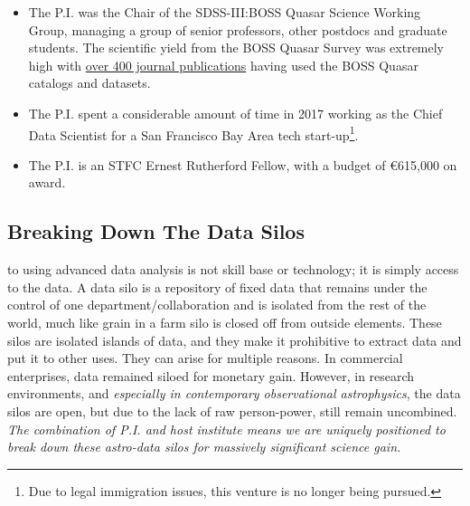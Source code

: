 \documentclass[oneside, a4paper, onecolumn, 11pt]{article}
\begin{document}
\begin{itemize}
\item The P.I. was the Chair
of the SDSS-III:BOSS Quasar Science Working Group, managing a
group of senior professors, other postdocs and graduate students.
The scientific yield from the BOSS Quasar Survey was extremely high 
with \href{https://tinyurl.com/ycxd8lb6}{over 400 journal publications} having 
used the BOSS Quasar catalogs and datasets.

\item The P.I. spent a considerable amount of time in 2017 working as the
Chief Data Scientist for a San Francisco Bay Area 
tech start-up\footnote{Due to legal immigration issues, this venture is no longer being pursued.}. 

\item The P.I. is an STFC Ernest Rutherford Fellow, with a budget of \euro615,000 on award. 
\end{itemize}

\subsection*{Breaking Down The Data Silos}
to using advanced data analysis is not skill base or technology; it is
simply access to the data.  A data silo is a repository of fixed data
that remains under the control of one department/collaboration and is
isolated from the rest of the world, much like grain in a farm silo is
closed off from outside elements. These silos are isolated islands of
data, and they make it prohibitive to extract data and put it to other
uses. They can arise for multiple reasons. In commercial enterprises,
data remained siloed for monetary gain.  However, in research
environments, and {\it especially in contemporary observational
astrophysics}, the data silos are open, but due to the lack of raw
person-power, still remain uncombined. {\it The combination 
of P.I. and host institute means we are uniquely positioned to 
break down these astro-data silos for massively significant 
science gain.}
\end{document}
